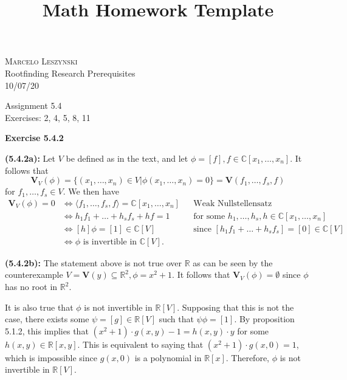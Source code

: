 \documentclass[12pt,oneside]{article}
\newenvironment{exercise}[1]{\vspace{.1in}\noindent\textbf{Exercise #1 \hspace{.05em}}}{}
\newcommand{\R}{\mathbb{R}}
\newcommand{\C}{\mathbb{C}}
\begin{document}
\title{Math Homework Template}

\begin{flushright}
\textsc{Marcelo Leszynski}  \\
Rootfinding Research Prerequisites\\
10/07/20
\end{flushright}

\begin{center}
\textsf{Assignment 5.4 } \\
\textsf{Exercises: 2, 4, 5, 8, 11 }
\end{center}


\begin{exercise}{5.4.2}
    
    \bigskip
    \textbf{(5.4.2a):}
    Let $V$ be defined as in the text, and let $\phi=[f], f\in \C[x_1,\ldots,x_n]$.
    It follows that 
    \[
        \mathbf{V}_V(\phi)=\{(x_1,\ldots,x_n) \in V \vert \phi(x_1,\ldots,x_n)=0\}=\mathbf{V}(f_1,\ldots,f_s,f)
    \]
    for $f_1,\ldots,f_s \in V$. We then have 
    \begin{align*}
        \mathbf{V}_V(\phi)=0    &\Leftrightarrow \langle f_1,\ldots,f_s,f\rangle = \C[x_1,\ldots,x_n] && \text{Weak Nullstellensatz}\\
                                &\Leftrightarrow h_1f_1+\ldots+h_sf_s+hf=1&&\text{for some }h_1,\ldots,h_s,h \in \C[x_1,\ldots,x_n]\\
                                &\Leftrightarrow [h]\phi = [1] \in \C[V]&&\text{since }[h_1f_1+\ldots+h_sf_s]=[0] \in \C[V]\\
                                &\Leftrightarrow \phi \text{ is invertible in }\C[V].
    \end{align*}
    
    \bigskip
    \textbf{(5.4.2b):}
    The statement above is not true over $\R$ as can be seen by the 
    counterexample $V=\mathbf{V}(y) \subseteq \R^2, \phi=x^2+1$. It 
    follows that $\mathbf{V}_V(\phi)=\emptyset$ since $\phi$ has no root in 
    $\R^2$. 
    
    It is also true that $\phi$ is not invertible in $\R[V]$. 
    Supposing that this is not the case, there exists some $\psi=[g] \in \R[V]$ 
    such that $\psi\phi=[1]$. By proposition 5.1.2, this implies that 
    $(x^2+1)\cdot g(x,y)-1 = h(x,y) \cdot y$ for some $h(x,y)\in \R[x,y]$. 
    This is equivalent to saying that $(x^2+1)\cdot g(x,0)=1$, which is 
    impossible since $g(x,0)$ is a polynomial in $\R[x]$. Therefore, 
    $\phi$ is not invertible in $\R[V]$.

\end{exercise}
\end{document}

